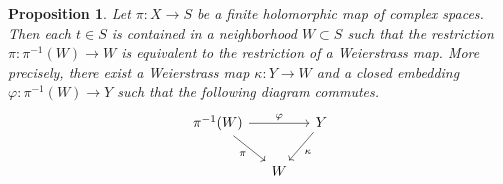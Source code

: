 \documentclass[12pt,b5paper,notitlepage]{report}
\theoremstyle{definition}
\theoremstyle{plain}
\newtheorem{pp}[df]{Proposition}
\numberwithin{equation}{section}
\begin{document}
\begin{pp}\label{lb89}
Let $\pi:X\rightarrow S$ be a finite holomorphic map of complex spaces. Then each $t\in S$ is contained in a neighborhood $W\subset S$ such that the restriction $\pi:\pi^{-1}(W)\rightarrow W$ is equivalent to the restriction of a Weierstrass map. More precisely, there exist a Weierstrass map $\kappa:Y\rightarrow W$ and a closed embedding $\varphi:\pi^{-1}(W)\rightarrow Y$ such that the following diagram commutes.
\begin{equation}
\begin{tikzcd}[column sep=small]
\pi^{-1}(W) \arrow[rd,"\pi"'] \arrow[rr,"\varphi"] &   & Y \arrow[ld,"\kappa"] \\
                        & W &             
\end{tikzcd}
\end{equation} 
\end{pp}
\end{document}
